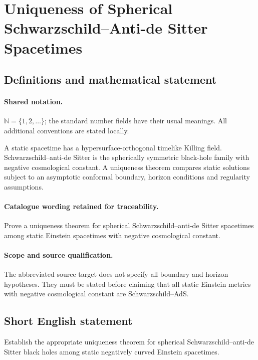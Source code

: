\documentclass[11pt]{article}
\begin{document}
\section{Uniqueness of Spherical Schwarzschild–Anti-de Sitter Spacetimes}\label{statement}

\subsection{Definitions and mathematical statement}

\paragraph{Shared notation.}$\mathbb N=\{1,2,\ldots\}$; the standard number fields have their usual meanings. All additional conventions are stated locally.


A static spacetime has a hypersurface-orthogonal timelike Killing field. Schwarzschild--anti-de Sitter is the spherically symmetric black-hole family with negative cosmological constant. A uniqueness theorem compares static solutions subject to an asymptotic conformal boundary, horizon conditions and regularity assumptions.

\paragraph{Catalogue wording retained for traceability.}
Prove a uniqueness theorem for spherical Schwarzschild–anti-de Sitter spacetimes among static Einstein spacetimes with negative cosmological constant.

\paragraph{Scope and source qualification.}The abbreviated source target does not specify all boundary and horizon hypotheses. They must be stated before claiming that all static Einstein metrics with negative cosmological constant are Schwarzschild--AdS.
\subsection{Short English statement}
Establish the appropriate uniqueness theorem for spherical Schwarzschild--anti-de Sitter black holes among static negatively curved Einstein spacetimes.
\end{document}
